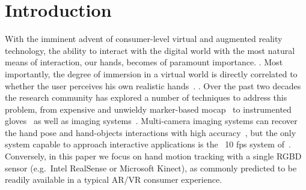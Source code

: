% 
% 
% 
% 



\section{Introduction}
With the imminent advent of consumer-level virtual and augmented reality technology, the ability to interact with the digital world with the most natural means of interaction, our hands, becomes of paramount importance. . Most importantly, the degree of immersion in a virtual world is directly correlated to whether the user perceives his own realistic hands~. . Over the past two decades the research community has explored a number of techniques to address this problem, from expensive and unwieldy marker-based mocap~\cite{mocapsurvey} to instrumented gloves~\cite{dipietro2008survey} as well as imaging systems~\cite{erol2007survey}. Multi-camera imaging systems can recover the hand pose and hand-objects interactions with high accuracy~\cite{ballan2013salient}, but the only system capable to approach interactive applications is the ~10 fps system of~\cite{sridhar2013multicam}. Conversely, in this paper we focus on hand motion tracking with a single RGBD sensor (e.g.\ Intel RealSense or Microsoft Kinect), as commonly predicted to be readily available in a typical AR/VR consumer experience.

